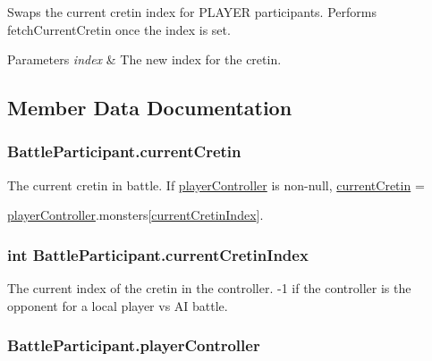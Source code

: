 Swaps the current cretin index for P\-L\-A\-Y\-E\-R participants. Performs fetch\-Current\-Cretin once the index is set. 


\begin{DoxyParams}{Parameters}
{\em index} & The new index for the cretin.\\
\hline
\end{DoxyParams}


\subsection{Member Data Documentation}
\hypertarget{class_battle_participant_a595abdc8d0d62918b99b37ea9d948d00}{
\subsubsection[{current\-Cretin}]{ Battle\-Participant.\-current\-Cretin}}\label{class_battle_participant_a595abdc8d0d62918b99b37ea9d948d00}


The current cretin in battle. If \hyperlink{class_battle_participant_a2f1584b2283c99eaaaa8e5b66ced968f}{player\-Controller} is non-\/null, \hyperlink{class_battle_participant_a595abdc8d0d62918b99b37ea9d948d00}{current\-Cretin} = 

{\ttfamily \hyperlink{class_battle_participant_a2f1584b2283c99eaaaa8e5b66ced968f}{player\-Controller}.monsters\mbox{[}\hyperlink{class_battle_participant_a1ad2e6be9469ff3c433be70fc6245484}{current\-Cretin\-Index}\mbox{]}}. \hypertarget{class_battle_participant_a1ad2e6be9469ff3c433be70fc6245484}{
\subsubsection[{current\-Cretin\-Index}]{\setlength{\rightskip}{0pt plus 5cm}int Battle\-Participant.\-current\-Cretin\-Index}}\label{class_battle_participant_a1ad2e6be9469ff3c433be70fc6245484}


The current index of the cretin in the controller. -\/1 if the controller is the opponent for a local player vs A\-I battle. 

\hypertarget{class_battle_participant_a2f1584b2283c99eaaaa8e5b66ced968f}{
\subsubsection[{player\-Controller}]{ Battle\-Participant.\-player\-Controller}}\label{class_battle_participant_a2f1584b2283c99eaaaa8e5b66ced968f}


